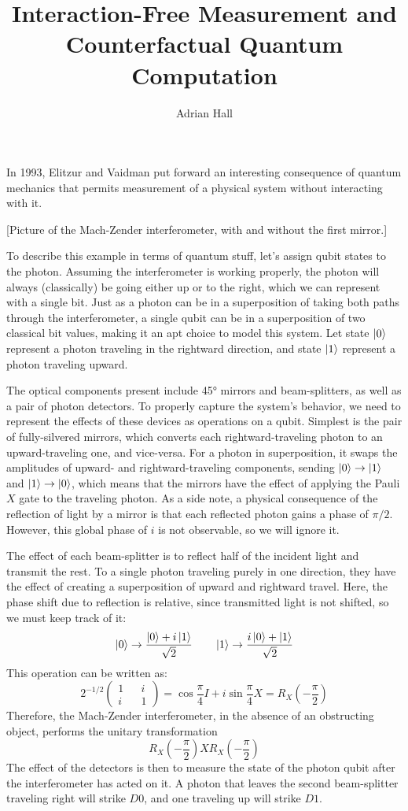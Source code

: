 \documentclass{article}
\author{Adrian Hall}
\title{Interaction-Free Measurement and Counterfactual Quantum Computation}
\begin{document}
\maketitle

In 1993, Elitzur and Vaidman put forward an interesting consequence of quantum mechanics that permits measurement of a physical system without interacting with it.

[Picture of the Mach-Zender interferometer, with and without the first mirror.]

To describe this example in terms of quantum stuff, let's assign qubit states to the photon. Assuming the interferometer is working properly, the photon will always (classically) be going either up or to the right, which we can represent with a single bit. Just as a photon can be in a superposition of taking both paths through the interferometer, a single qubit can be in a superposition of two classical bit values, making it an apt choice to model this system. Let state $\ket 0$ represent a photon traveling in the rightward direction, and state $\ket 1$ represent a photon traveling upward.

The optical components present include 45° mirrors and beam-splitters, as well as a pair of photon detectors. To properly capture the system's behavior, we need to represent the effects of these devices as operations on a qubit. Simplest is the pair of fully-silvered mirrors, which converts each rightward-traveling photon to an upward-traveling one, and vice-versa. For a photon in superposition, it swaps the amplitudes of upward- and rightward-traveling components, sending $\ket 0 \to \ket 1$ and $\ket 1 \to \ket 0$, which means that the mirrors have the effect of applying the Pauli $X$ gate to the traveling photon. As a side note, a physical consequence of the reflection of light by a mirror is that each reflected photon gains a phase of $\pi/2$. However, this global phase of $i$ is not observable, so we will ignore it.

The effect of each beam-splitter is to reflect half of the incident light and transmit the rest. To a single photon traveling purely in one direction, they have the effect of creating a superposition of upward and rightward travel. Here, the phase shift due to reflection is relative, since transmitted light is not shifted, so we must keep track of it:
$$\ket 0 \to \frac{\ket 0 + i\ket 1}{\sqrt{2}} \qquad \ket 1 \to \frac{i\ket 0 + \ket 1}{\sqrt{2}}$$
This operation can be written as:
$$2^{-1/2}\begin{pmatrix}1 && i \\ i && 1\end{pmatrix} = \cos\frac{\pi}{4}I + i\sin\frac{\pi}{4}X = R_X\left(-\frac{\pi}{2}\right)$$
Therefore, the Mach-Zender interferometer, in the absence of an obstructing object, performs the unitary transformation
$$R_X\left(-\frac{\pi}{2}\right)XR_X\left(-\frac{\pi}{2}\right)$$
The effect of the detectors is then to measure the state of the photon qubit after the interferometer has acted on it. A photon that leaves the second beam-splitter traveling right will strike $D0$, and one traveling up will strike $D1$.
\end{document}
